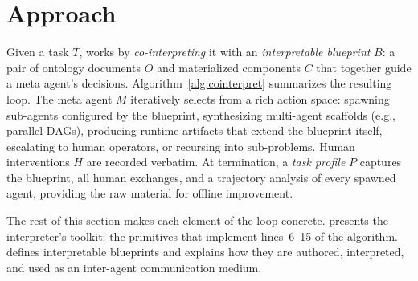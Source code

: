 \section{Approach}
\label{sec:approach}

Given a task $T$, \sysname works by \emph{co-interpreting} it with an \emph{interpretable blueprint} $B$: a pair of ontology documents $O$ and materialized components $C$ that together guide a meta agent's decisions.
Algorithm~\ref{alg:cointerpret} summarizes the resulting loop.
The meta agent $M$ iteratively selects from a rich action space: spawning sub-agents configured by the blueprint, synthesizing multi-agent scaffolds (e.g., parallel DAGs), producing runtime artifacts that extend the blueprint itself, escalating to human operators, or recursing into sub-problems.
Human interventions $H$ are recorded verbatim.
At termination, a \emph{task profile} $P$ captures the blueprint, all human exchanges, and a trajectory analysis of every spawned agent, providing the raw material for offline improvement.

The rest of this section makes each element of the loop concrete.
 presents the interpreter's toolkit: the primitives that implement lines~6--15 of the algorithm.
 defines interpretable blueprints and explains how they are authored, interpreted, and used as an inter-agent communication medium.


